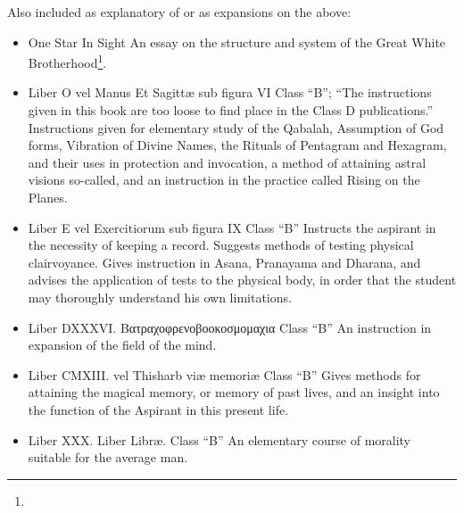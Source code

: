 \begin{samepage}
Also included as explanatory of or as expansions on the above: \begin{itemize}
\item One Star In Sight \textemdash{} An essay on the structure and system of the Great White Brotherhood\footnote{\Argentium{}}.
\item Liber O vel Manus Et Sagitt\ae{} sub figura VI \textemdash{} Class \enquote{B}; \enquote{The instructions given in this book are too loose to find place in the Class D publications.} \textemdash{} Instructions given for elementary study of the Qabalah, Assumption of God forms, Vibration of Divine Names, the Rituals of Pentagram and Hexagram, and their uses in protection and invocation, a method of attaining astral visions so-called, and an instruction in the practice called Rising on the Planes.
\item Liber E vel Exercitiorum sub figura IX \textemdash{} Class \enquote{B} \textemdash{} Instructs the aspirant in the necessity of keeping a record. Suggests methods of testing physical clairvoyance. Gives instruction in Asana, Pranayama and Dharana, and advises the application of tests to the physical body, in order that the student may thoroughly understand his own limitations.
\item Liber DXXXVI. \textgreek{Βατραχοφρενοβοοκοσμομαχια} \textemdash{} Class \enquote{B} \textemdash{} An instruction in expansion of the field of the mind.
\item Liber CMXIII.  vel Thisharb vi\ae{}{} memori\ae{}{} \textemdash{} Class \enquote{B} \textemdash{} Gives methods for attaining the magical memory, or memory of past lives, and an insight into the function of the Aspirant in this present life.
\item Liber XXX. Liber Libr\ae{}. \textemdash{} Class \enquote{B} \textemdash{} An elementary course of morality suitable for the average man.
\end{itemize}
\end{samepage}

